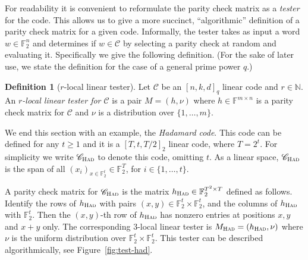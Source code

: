 \documentclass[11pt]{article}
\theoremstyle{definition}
\newtheorem{definition}[theorem]{Definition}
\newcommand{\code}{\mathscr{C}}
\newcommand{\field}{\mathbb{F}_2}
\newcommand{\N}{\ensuremath{\mathbb{N}}}
\newcommand{\F}{\ensuremath{\mathbb{F}}}
\newcommand{\had}{\textsc{Had}}
\begin{document}
For readability it is convenient to reformulate the parity check matrix as a \emph{tester} for the code. This allows us to give a more succinct, ``algorithmic'' definition of a parity check matrix for a given code. Informally, the tester takes as input a word $w\in \F_2^n$ and determines if $w\in \code$ by selecting a parity check at random and evaluating it. 
 Specifically we give the following definition. (For the sake of later use, we state the definition for the case of a general prime power $q$.)

\begin{definition}[$r$-local linear tester]\label{def:code-test}
Let $\code$ be an $[n,k,d]_q$ linear code and $r\in \N$.
An \emph{$r$-local linear tester for $\code$} is a pair $M = (h,\nu)$ where $h \in \F^{m \times n}$ is a parity check matrix for $\code$ and $\nu$ is a distribution over $\{1,\ldots,m\}$. 
\end{definition}

We end this section with an example, the \emph{Hadamard code}. This code can be defined for any  $t\geq 1$ and it is a $[T,t,T/2]_2$ linear code, where $T=2^t$. For simplicity we write  $\code_\had$ to denote this code, omitting $t$. As a linear space, $\code_\had$ is the span of all $(x_i)_{x\in \field^t} \in \field^T$, for $i\in \{1,\ldots,t\}$.  

A parity check matrix for $\code_\had$ is the matrix $h_\had\in \F_2^{T^2\times T}$ defined as follows. Identify the rows of $h_\had$ with pairs $(x,y)\in \F_2^t\times \F_2^t$, and the columns of $h_\had$ with $\F_2^t$. Then the $(x,y)$-th row of $h_\had$ has nonzero entries at positions $x,y$ and $x+y$ only. 
The corresponding $3$-local linear tester is $M_\had = (h_\had,\nu)$ where $\nu$ is the uniform distribution over $\F_2^t \times \F_2^t$. This tester can be described algorithmically, see Figure~\ref{fig:test-had}. 
\end{document}
